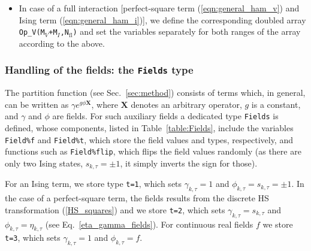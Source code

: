 \begin{itemize}
\item In case of a full interaction [perfect-square term (\ref{eqn:general_ham_v}) and Ising term (\ref{eqn:general_ham_i})],
we  define  the corresponding doubled array \texttt{Op\_V(M$_V$+M$_I$,N$_\mathrm{fl}$)} and set the variables separately for both ranges of the array according to the above.  

\end{itemize}

\subsubsection{ Handling of the fields: the \texttt{Fields}  type } \label{sec:fields}

The partition function (see Sec.~\ref{sec:method}) consists of terms which, in general, can be written as $\gamma e^{g \phi \bm{X} }$, where $\bm{X}$ denotes an arbitrary operator, $g$ is a constant, and $\gamma$ and $\phi$ are fields. 
For such auxiliary fields a dedicated type \texttt{Fields} is defined, whose components, listed in Table~\ref{table:Fields}, include the variables \texttt{Field\%f} and \texttt{Field\%t}, which store the field values and types, respectively, and functions such as \texttt{Field\%flip}, which flips the field values randomly (as there are only two Ising states, $s_{k,\tau} = \pm 1$, it simply inverts the sign for those).

For an Ising term, we store type \texttt{t=1}, which sets $\gamma_{k,\tau} = 1$ and $\phi_{k,\tau}=s_{k,\tau} = \pm 1$. 
In the case of a perfect-square term, the fields results from the discrete HS transformation (\ref{HS_squares}) and we store \texttt{t=2}, which sets $\gamma_{k,\tau} = s_{k,\tau}$ and $\phi_{k,\tau}=\eta_{k,\tau}$ (see Eq.~\ref{eta_gamma_fields}). For continuous real fields $f$ we store \texttt{t=3}, which sets $\gamma_{k,\tau} = 1$ and $\phi_{k,\tau}=f$.

